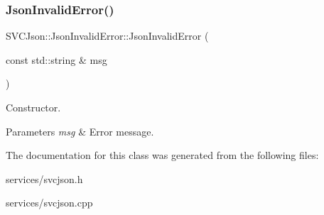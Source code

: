 \subsubsection{\texorpdfstring{JsonInvalidError()}{JsonInvalidError()}}
{\footnotesize\ttfamily S\+V\+C\+Json\+::\+Json\+Invalid\+Error\+::\+Json\+Invalid\+Error (\begin{DoxyParamCaption}\item[{const std\+::string \&}]{msg }\end{DoxyParamCaption})}



Constructor. 


\begin{DoxyParams}{Parameters}
{\em msg} & Error message. \\
\hline
\end{DoxyParams}


The documentation for this class was generated from the following files\+:\begin{DoxyCompactItemize}
\item 
services/svcjson.\+h\item 
services/svcjson.\+cpp\end{DoxyCompactItemize}
